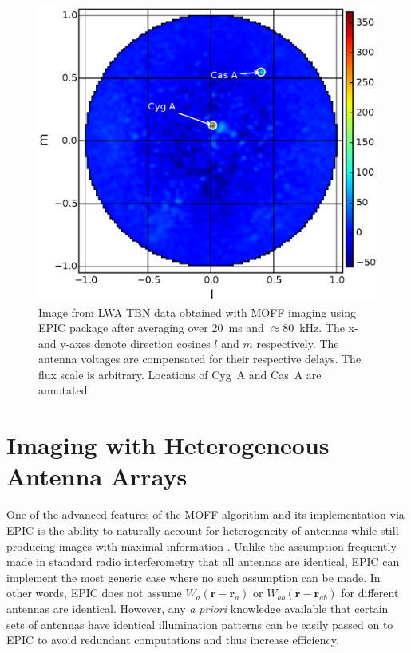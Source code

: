 \documentclass[a4paper,fleqn,usenatbib]{mnras}
\begin{document}
\begin{figure}
  \includegraphics[width=\columnwidth]{figure9}
  \caption{Image from LWA TBN data obtained with MOFF imaging using EPIC 
    package after averaging over 20~ms and $\approx 80$~kHz. The x- and y-axes
    denote direction cosines $l$ and $m$ respectively. The antenna voltages
    are compensated for their respective delays. The flux scale is arbitrary.
    Locations of Cyg~A and Cas~A are annotated.}
  \label{fig:LWA-image}
\end{figure}

\section{Imaging with Heterogeneous Antenna Arrays}\label{sec:versatility}

One of the advanced features of the MOFF algorithm and its implementation via EPIC is the ability to naturally account for heterogeneity of antennas while still producing images with maximal information \citep{mor11}. Unlike the assumption frequently made in standard radio interferometry that all antennas are identical, EPIC can implement the most generic case where no such assumption can be made. In other words, EPIC does not assume $W_a(\mathbf{r}-\mathbf{r}_a)$ or $W_{ab}(\mathbf{r}-\mathbf{r}_{ab})$ for different antennas are identical. However, any {\it a priori} knowledge available that certain sets of antennas have identical illumination patterns can be easily passed on to EPIC to avoid redundant computations and thus increase efficiency.
\end{document}
